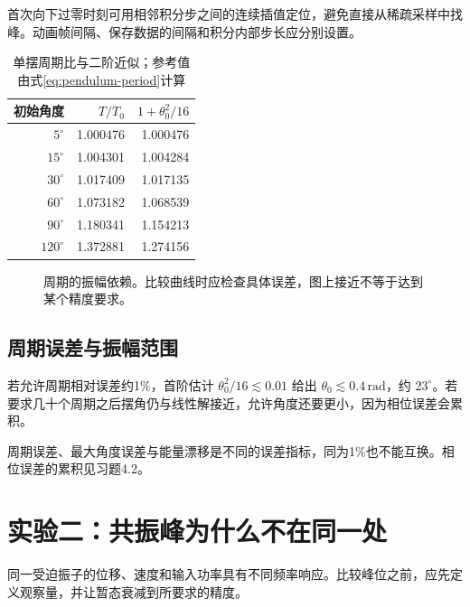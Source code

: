 \documentclass[11pt,openany,fontset=fandol]{ctexbook}
\theoremstyle{plain}\newtheorem{theorem}{定理}[chapter]\newtheorem{proposition}[theorem]{命题}
\theoremstyle{definition}\newtheorem{definition}{定义}[chapter]\newtheorem{example}{例}[chapter]
\theoremstyle{remark}\newtheorem*{remark}{说明}
\begin{document}
首次向下过零时刻可用相邻积分步之间的连续插值定位，避免直接从稀疏采样中找峰。动画帧间隔、保存数据的间隔和积分内部步长应分别设置。

\begin{table}[htbp]\centering\caption{单摆周期比与二阶近似；参考值由式\eqref{eq:pendulum-period}计算}
\begin{tabular}{rrr}\toprule
初始角度 & $T/T_0$ & $1+\theta_0^2/16$\\\midrule
$5^\circ$ &1.000476&1.000476\\
$15^\circ$&1.004301&1.004284\\
$30^\circ$&1.017409&1.017135\\
$60^\circ$&1.073182&1.068539\\
$90^\circ$&1.180341&1.154213\\
$120^\circ$&1.372881&1.274156\\\bottomrule
\end{tabular}\end{table}

\begin{figure}[htbp]\centering
{}
\caption{周期的振幅依赖。比较曲线时应检查具体误差，图上接近不等于达到某个精度要求。}
\label{fig:orig-085}
\end{figure}

\subsection{周期误差与振幅范围}
若允许周期相对误差约1\%，首阶估计 $\theta_0^2/16\lesssim0.01$ 给出 $\theta_0\lesssim0.4\,\mathrm{rad}$，约 $23^\circ$。若要求几十个周期之后摆角仍与线性解接近，允许角度还要更小，因为相位误差会累积。

周期误差、最大角度误差与能量漂移是不同的误差指标，同为1\%也不能互换。相位误差的累积见习题4.2。

\section{实验二：共振峰为什么不在同一处}
同一受迫振子的位移、速度和输入功率具有不同频率响应。比较峰位之前，应先定义观察量，并让暂态衰减到所要求的精度。
\end{document}
